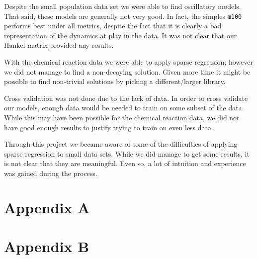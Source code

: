 \documentclass[10pt]{article}
\begin{document}
Despite the small population data set we were able to find oscillatory models. That said, these models are generally not very good. In fact, the simples {\tt m100} performs best under all metrics, despite the fact that it is clearly a bad representation of the dynamics at play in the data. It was not clear that our Hankel matrix provided any results.

With the chemical reaction data we were able to apply sparse regression; however we did not manage to find a non-decaying solution. Given more time it might be possible to find non-trivial solutions by picking a different/larger library.

Cross validation was not done due to the lack of data. In order to cross validate our models, enough data would be needed to train on some subset of the data. While this may have been possible for the chemical reaction data, we did not have good enough results to justify trying to train on even less data.

Through this project we became aware of some of the difficulties of applying sparse regression to small data sets. While we did manage to get some results, it is not clear that they are meaningful. Even so, a lot of intuition and experience was gained during the process.

\pagebreak



\onecolumn
\section{Appendix A}
\label{AppendixA}










\pagebreak
\section{Appendix B}


\end{document}
